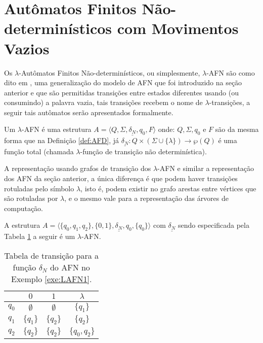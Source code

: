 \section{Autômatos Finitos Não-determinísticos com Movimentos Vazios}\label{sec:LAFN}

Os $\lambda$-Autômatos Finitos Não-determinísticos, ou simplesmente, $\lambda$-AFN são como dito em \cite{menezes1998LFA}, uma generalização do modelo de AFN que foi introduzido na seção anterior e que são permitidas transições entre estados diferentes usando (ou consumindo) a palavra vazia, tais transições recebem o nome de $\lambda$-transições, a seguir tais autômatos serão apresentados formalmente.

\begin{definition}\label{def:LAFN}
	Um $\lambda$-AFN é uma estrutura $A = \langle Q, \Sigma, \underline{\delta_N}, q_0, F\rangle$ onde: $Q, \Sigma, q_0$ e $F$ são da mesma forma que na Definição \ref{def:AFD}, já $\underline{\delta_N} : Q \times (\Sigma \cup \{\lambda\}) \rightarrow \wp(Q)$ é uma função total (chamada $\lambda$-função de transição não determinística).
\end{definition}

A representação usando grafos de transição dos $\lambda$-AFN e similar a representação dos AFN da seção anterior, a única diferença é que podem haver transições rotuladas pelo símbolo $\lambda$, isto é, podem existir no grafo arestas entre vértices que são rotuladas por $\lambda$, e o mesmo vale para a representação das árvores de computação.

\begin{example}\label{exe:LAFN1}
	A estrutura $A = \langle \{q_0, q_1, q_2\}, \{0,1\}, \underline{\delta_N}, q_0, \{q_0\}\rangle$ com $\underline{\delta_N}$ sendo especificada pela Tabela \ref{tab:DeltaLAFN1} a seguir é um $\lambda$-AFN.
	
	\begin{table}[h]
		\centering
		\scriptsize
		\begin{tabular}{c|ccc}
			\backslashbox{$Q$}{$\Sigma \cup \{\lambda\}$}	& $0$ & $1$ & $\lambda$\\ \hline
			$q_0$  & $\emptyset$ & $\emptyset$ & $\{q_1\}$\\
			$q_1$  & $\{q_1\}$ & $\{q_2\}$ & $\{q_2\}$\\
			$q_2$  & $\{q_2\}$ & $\{q_2\}$ & $\{q_0, q_2\}$ \\ \hline
		\end{tabular}
		\caption{Tabela de transição para a função $\delta_N$ do AFN no Exemplo \ref{exe:LAFN1}.}
		\label{tab:DeltaLAFN1}
	\end{table}
\end{example} 

